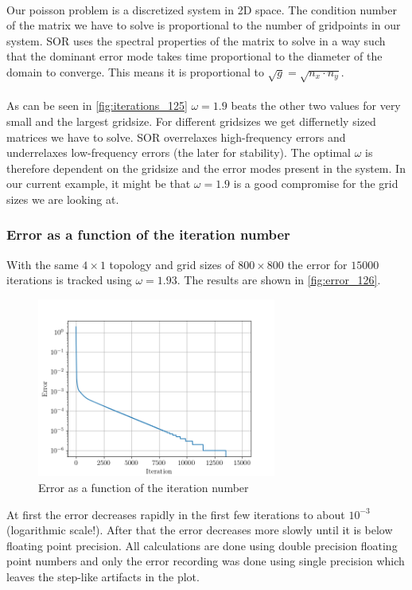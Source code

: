 \\
Our poisson problem is a discretized system in 2D space. The condition number of the matrix we have to solve is proportional to the number of gridpoints in our system. SOR uses the spectral properties of the matrix to solve in a way such that the dominant error mode takes time proportional to the diameter of the domain to converge. This means it is proportional to $\sqrt{g} = \sqrt{n_x \cdot n_y}$.\\

\\
As can be seen in \autoref{fig:iterations_125} $\omega = 1.9$ beats the other two values for very small and the largest gridsize. For different gridsizes we get differnetly sized matrices we have to solve. SOR overrelaxes high-frequency errors and underrelaxes low-frequency errors (the later for stability). The optimal $\omega$ is therefore dependent on the gridsize and the error modes present in the system. In our current example, it might be that $\omega = 1.9$ is a good compromise for the grid sizes we are looking at.

\subsubsection{Error as a function of the iteration number}
With the same $4 \times 1$ topology and grid sizes of $800 \times 800$ the error for $15000$ iterations is tracked using $\omega = 1.93$. The results are shown in \autoref{fig:error_126}.
\begin{figure}[H]
    \centering
    \includegraphics[width=0.7\textwidth]{../fig/lab1/errors_126.png}
    \caption{Error as a function of the iteration number}
    \label{fig:error_126}
\end{figure}
At first the error decreases rapidly in the first few iterations to about $10^{-3}$ (logarithmic scale!). After that the error decreases more slowly until it is below floating point precision.  All calculations are done using double precision floating point numbers and only the error recording was done using single precision which leaves the step-like artifacts in the plot. 

